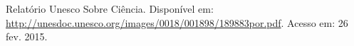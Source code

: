 \documentclass[brazil,ruledheader]{abntifes}
\begin{document}
\listoffigures

\listoftables


\tableofcontents{}














%


\begin{thebibliography}{9}

    Relatório Unesco Sobre Ciência. Disponível em: \url{http://unesdoc.unesco.org/images/0018/001898/189883por.pdf}.
    Acesso em: 26 fev. 2015.

\end{thebibliography}


\anexo
\end{document}
